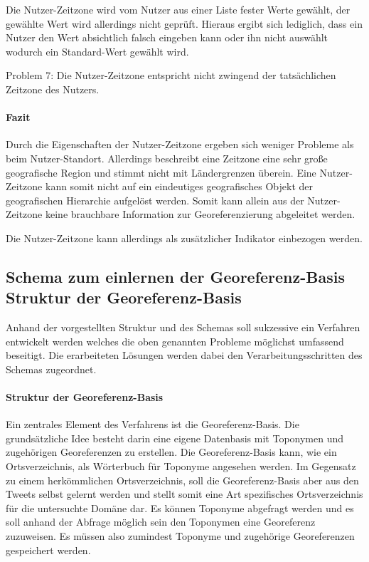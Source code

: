 				Die Nutzer-Zeitzone wird vom Nutzer aus einer Liste fester Werte gewählt, der gewählte Wert wird allerdings nicht geprüft.
				Hieraus ergibt sich lediglich, dass ein Nutzer den Wert absichtlich falsch eingeben kann oder ihn nicht auswählt wodurch ein Standard-Wert gewählt wird.

				Problem 7: Die Nutzer-Zeitzone entspricht nicht zwingend der tatsächlichen Zeitzone des Nutzers.

				\paragraph{Fazit}

				Durch die Eigenschaften der Nutzer-Zeitzone ergeben sich weniger Probleme als beim Nutzer-Standort.
				Allerdings beschreibt eine Zeitzone eine sehr große geografische Region und stimmt nicht mit Ländergrenzen überein.
				Eine Nutzer-Zeitzone kann somit nicht auf ein eindeutiges geografisches Objekt der geografischen Hierarchie aufgelöst werden.
				Somit kann allein aus der Nutzer-Zeitzone keine brauchbare Information zur Georeferenzierung abgeleitet werden. 
				
				Die Nutzer-Zeitzone kann allerdings als zusätzlicher Indikator einbezogen werden.


				\subsection{Schema zum einlernen der Georeferenz-Basis  Struktur der Georeferenz-Basis}			
					
					Anhand der vorgestellten Struktur und des Schemas soll sukzessive ein Verfahren entwickelt werden welches die oben genannten Probleme möglichst umfassend beseitigt. 
					Die erarbeiteten Lösungen werden dabei den Verarbeitungsschritten des Schemas zugeordnet. 

					\paragraph{Struktur der Georeferenz-Basis} 
						Ein zentrales Element des Verfahrens ist die Georeferenz-Basis.  
					 	Die grundsätzliche Idee besteht darin eine eigene Datenbasis mit Toponymen und zugehörigen Georeferenzen zu erstellen.
						Die Georeferenz-Basis kann, wie ein Ortsverzeichnis, als Wörterbuch für Toponyme angesehen werden.
						Im Gegensatz zu einem herkömmlichen Ortsverzeichnis, soll die Georeferenz-Basis aber aus den Tweets selbst gelernt werden und stellt somit eine Art spezifisches Ortsverzeichnis für die untersuchte Domäne dar.
						Es können Toponyme abgefragt werden und es soll anhand der Abfrage möglich sein den Toponymen eine Georeferenz zuzuweisen.
						Es müssen also zumindest Toponyme und zugehörige Georeferenzen gespeichert werden.


